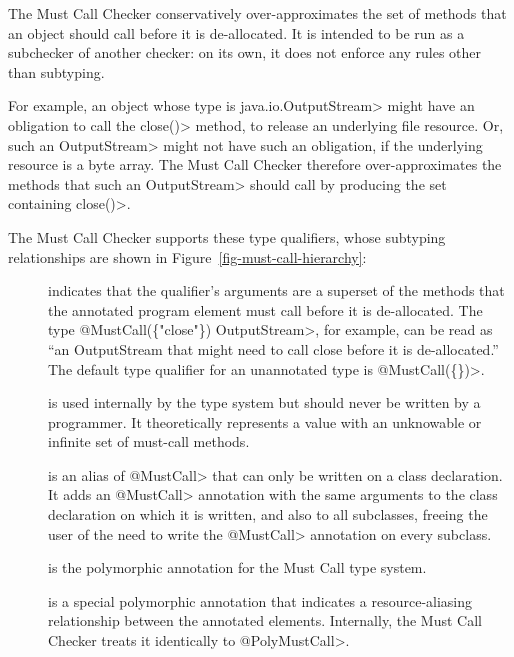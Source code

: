 \htmlhr
{}

The Must Call Checker conservatively over-approximates
the set of methods that an object should call before it is de-allocated.
It is intended to be run as a subchecker of another checker: on its own, it does not
enforce any rules other than subtyping.

For example, an object whose type is \<java.io.OutputStream> might
have an obligation to call the \<close()> method, to release an underlying file resource. Or,
such an \<OutputStream> might not have such an obligation, if the underlying resource is
a byte array. The Must Call Checker therefore over-approximates the methods that such an
\<OutputStream> should call by producing the set containing \<close()>.


The Must Call Checker supports these type qualifiers, whose subtyping relationships
are shown in Figure~\ref{fig-must-call-hierarchy}:

\begin{description}

\item[]
  indicates that the qualifier's arguments are a superset of the methods that the annotated program element
  must call before it is de-allocated.
  The type \<@MustCall(\{"close"\}) OutputStream>, for example, can be read as ``an OutputStream that might need
  to call close before it is de-allocated.''
  The default type qualifier for an unannotated type is \<@MustCall(\{\})>.

\item[]
  is used internally by the type system but should never be written by a
  programmer.  It theoretically represents a value with an unknowable or infinite set
  of must-call methods.

\item[]
  is an alias of \<@MustCall> that can only be written on a class declaration. It adds an \<@MustCall>
  annotation with the same arguments to
  the class declaration on which it is written, and also to all subclasses, freeing the user of the need
  to write the \<@MustCall> annotation on every subclass.

\item[]
  is the polymorphic annotation for the Must Call type system.

\item[]
  is a special polymorphic annotation that indicates a resource-aliasing relationship between
  the annotated elements. Internally, the Must Call Checker treats it identically to \<@PolyMustCall>.


\end{description}

